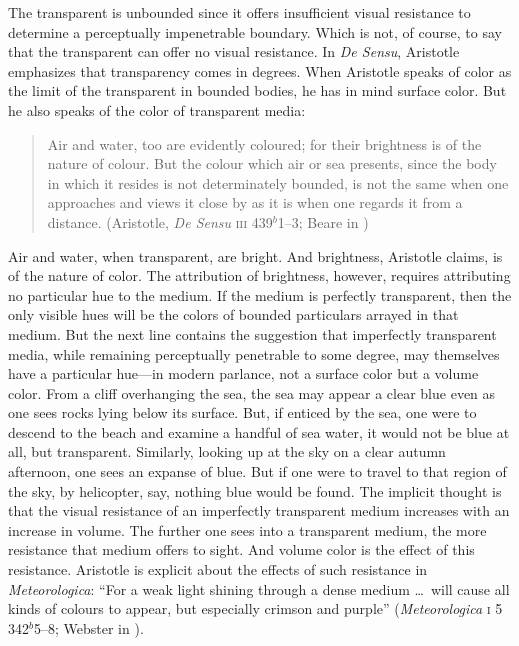 The transparent is unbounded since it offers insufficient visual resistance to determine a perceptually impenetrable boundary. Which is not, of course, to say that the transparent can offer no visual resistance. In \emph{De Sensu}, Aristotle emphasizes that transparency comes in degrees. When Aristotle speaks of color as the limit of the transparent in bounded bodies, he has in mind surface color. But he also speaks of the color of transparent media:
\begin{quote}
    Air and water, too are evidently coloured; for their brightness is of the nature of colour. But the colour which air or sea presents, since the body in which it resides is not determinately bounded, is not the same when one approaches and views it close by as it is when one regards it from a distance. (Aristotle, \emph{De Sensu} \textsc{iii} 439\( ^{b} \)1--3; Beare in \citealt[7]{Barnes:1984uq})
\end{quote}
Air and water, when transparent, are bright. And brightness, Aristotle claims, is of the nature of color. The attribution of brightness, however, requires attributing no particular hue to the medium. If the medium  is perfectly transparent, then the only visible hues will be the colors of bounded particulars arrayed in that medium. But the next line contains the suggestion that imperfectly transparent media, while remaining perceptually penetrable to some degree, may themselves have a particular hue---in modern parlance, not a surface color but a volume color. From a cliff overhanging the sea, the sea may appear a clear blue even as one sees rocks lying below its surface. But, if enticed by the sea, one were to descend to the beach and examine a handful of sea water, it would not be blue at all, but transparent. Similarly, looking up at the sky on a clear autumn afternoon, one sees an expanse of blue. But if one were to travel to that region of the sky, by helicopter, say, nothing blue would be found. The implicit thought is that the visual resistance of an imperfectly transparent medium increases with an increase in volume. The further one sees into a transparent medium, the more resistance that medium offers to sight. And volume color is the effect of this resistance. Aristotle is explicit about the effects of such resistance in \emph{Meteorologica}: ``For a weak light shining through a dense medium \ldots\ will cause all kinds of colours to appear, but especially crimson and purple'' (\emph{Meteorologica} \textsc{i} 5 342\( ^{b} \)5--8; Webster in \citealt[8--9]{Barnes:1984uq}).

